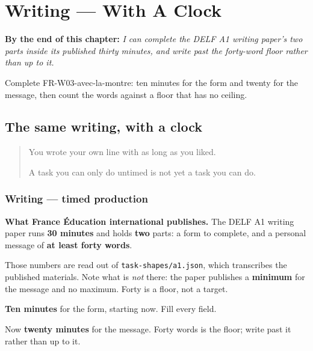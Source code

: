 
\chapter{Writing --- With A Clock}
\label{ch:fr-avec-la-montre}

\begin{chapteropening}
\textbf{By the end of this chapter:} \emph{I can complete the DELF A1 writing paper's two parts inside its published thirty minutes, and write past the forty-word floor rather than up to it.}

Complete FR-W03-avec-la-montre: ten minutes for the form and twenty for the message, then count the words against a floor that has no ceiling.
\end{chapteropening}

\section[(avec la montre)]{The same writing, with a clock}

\label{lesson:FR-W03-avec-la-montre}



\begin{quote}
You wrote your own line with as long as you liked.

A task you can only do untimed is not yet a task you can do.
\end{quote}

\subsection*{Writing — timed production}
\textbf{What France Éducation international publishes.} The DELF A1 writing paper runs \textbf{30 minutes} and holds \textbf{two} parts: a form to complete, and a personal message of \textbf{at least forty words}.

Those numbers are read out of \texttt{task-shapes/a1.json}, which transcribes the published materials. Note what is \emph{not} there: the paper publishes a \textbf{minimum} for the message and no maximum. Forty is a floor, not a target.

\textbf{Ten minutes} for the form, starting now. Fill every field.

Now \textbf{twenty minutes} for the message. Forty words is the floor; write past it rather than up to it.

